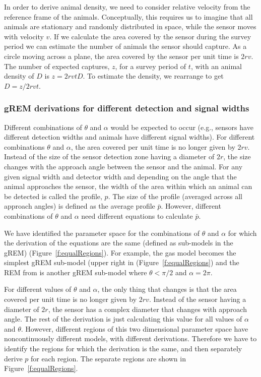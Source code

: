 In order to derive animal density, we need to consider relative velocity from the reference frame of the animals. Conceptually, this requires us to imagine that all animals are stationary and randomly distributed in space, while the sensor moves with velocity $v$. If we calculate the area covered by the sensor during the survey period we can estimate the number of animals the sensor should capture. As a circle moving across a plane, the area covered by the sensor per unit time is $2rv$. The number of expected captures, $z$, for a survey period of $t$, with an animal density of $D$ is $z = 2rvtD$. To estimate the density, we rearrange to get $D = z/2rvt$.

\subsubsection{gREM derivations for different detection and signal widths}
Different combinations of $\theta$ and $\alpha$ would be expected to occur (e.g., sensors have different detection widths and animals have different signal widths). For different combinations $\theta$ and $\alpha$, the area covered per unit time is no longer given by $2rv$. Instead of the size of the sensor detection zone having a diameter of $2r$, the size changes with the approach angle between the sensor and the animal. For any given signal width and detector width and depending on the angle that the animal approaches the sensor, the width of the area within which an animal can be detected is called the profile, $p$. The size of the profile (averaged across all approach angles) is defined as the average profile $\bar{p}$. However, different combinations of $\theta$ and $\alpha$ need different equations to calculate $\bar{p}$. 

We have identified the parameter space for the combinations of $\theta$ and $\alpha$ for which the derivation of the equations are the same (defined as sub-models in the gREM) (Figure~\ref{f:equalRegions}). For example, the gas model becomes the simplest gREM sub-model (upper right in (Figure~\ref{f:equalRegions}) and the REM from \citep{rowcliffe2008estimating} is another gREM sub-model where $\theta<\pi/2$ and $\alpha = 2\pi$.

For different values of $\theta$ and $\alpha$, the only thing that changes is that the area covered per unit time is no longer given by $2rv$. Instead of the sensor having a diameter of $2r$, the sensor has a complex diameter that changes with approach angle. The rest of the derivation is just calculating this value for all values of $\alpha$ and $\theta$. However, different regions of this two dimensional parameter space have noncontinuously different models, with different derivations. Therefore we have to identify the regions for which the derivation is the same, and then separately derive $p$ for each region. The separate regions are shown in Figure~\ref{f:equalRegions}.

